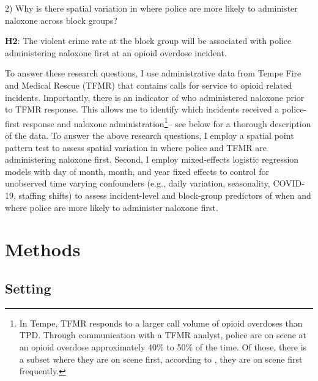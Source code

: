 2) Why is there spatial variation in where police are more likely to administer naloxone across block groups? 

\begin{flushleft}
\noindent \textbf{H2}: The violent crime rate at the block group will be associated with police administering naloxone first at an opioid overdose incident.
\end{flushleft}

To answer these research questions, I use administrative data from Tempe Fire and Medical Rescue (TFMR) that contains calls for service to opioid related incidents. Importantly, there is an indicator of who administered naloxone prior to TFMR response. This allows me to identify which incidents received a police-first response and naloxone administration\footnote{In Tempe, TFMR responds to a larger call volume of opioid overdoses than TPD. Through communication with a TFMR analyst, police are on scene at an opioid overdose approximately 40\% to 50\% of the time. Of those, there is a subset where they are on scene first, according to \textcite{white_leveraging_2022}, they are on scene first frequently.}-- see below for a thorough description of the data. To answer the above research questions, I employ a spatial point pattern test to assess spatial variation in where police and TFMR are administering naloxone first. Second, I employ mixed-effects logistic regression models with day of month, month, and year fixed effects to control for unobserved time varying confounders (e.g., daily variation, seasonality, COVID-19, staffing shifts) to assess incident-level and block-group predictors of when and where police are more likely to administer naloxone first.

\section{\centering Methods}
\subsection{Setting}

